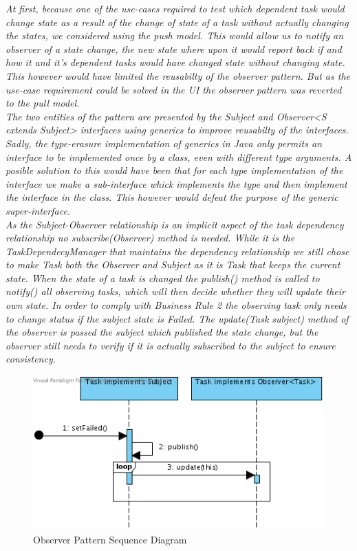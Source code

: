 				\emph{At first, because one of the use-cases required to test which dependent task would change state as a result of the change of state of a task without actually changing the states, we considered using the push model. This would allow us to notify an observer of a state change, the new state where upon it would report back if and how it and it's dependent tasks would have changed state without changing state. This however would have limited the reusabilty of the observer pattern. But as the use-case requirement could be solved in the UI the observer pattern was reverted to the pull model.\\
				The two entities of the pattern are presented by the Subject and Observer<S extends Subject> interfaces using generics to improve reusabilty of the interfaces. Sadly, the type-erasure implementation of generics in Java only permits an interface to be implemented once by a class, even with different type arguments. A posible solution to this would have been that for each type implementation of the interface we make a sub-interface whick implements the type and then implement the interface in the class. This however would defeat the purpose of the generic super-interface.\\
				As the Subject-Observer relationship is an implicit aspect of the task dependency relationship no subscribe(Observer) method is needed. While it is the TaskDependecyManager that maintains the dependency relationship we still chose to make Task both the Observer and Subject as it is Task that keeps the current state. When the state of a task is changed the publish() method is called to notify() all observing tasks, which will then decide whether they will update their own state. In order to comply with Business Rule 2 the observing task only needs to change status if the subject state is Failed. The update(Task subject) method of the observer is passed the subject which published the state change, but the observer still needs to verify if it is actually subscribed to the subject to ensure consistency.}

				\begin{figure}[H]
					\begin{center}
						\includegraphics[scale=0.7]{images/Observer_Pattern.png}
					\end{center}
					\caption{Observer Pattern Sequence Diagram}
				\end{figure}
				
